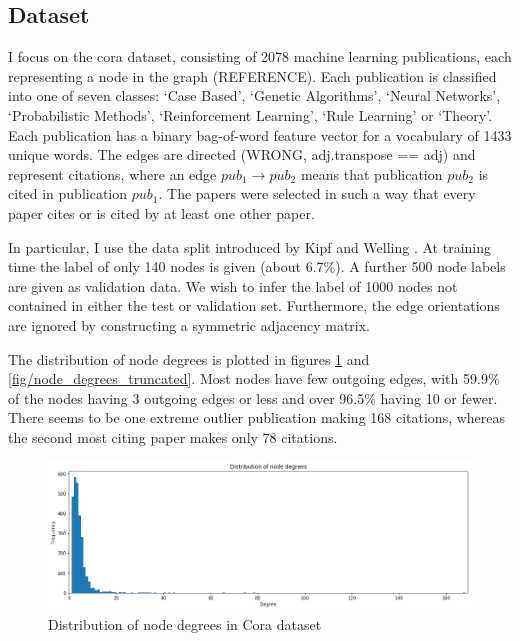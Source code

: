 \documentclass[12pt]{article}
\theoremstyle{definition}
\begin{document}
\subsection{Dataset}
I focus on the cora dataset, consisting of 2078 machine learning publications, each representing a node in the graph (REFERENCE). Each publication is classified into one of seven classes: `Case Based', `Genetic Algorithms', `Neural Networks', `Probabilistic Methods', `Reinforcement Learning', `Rule Learning' or `Theory'. Each publication has a binary bag-of-word feature vector for a vocabulary of 1433 unique words. The edges are directed (WRONG, adj.transpose == adj) and represent citations, where an edge $\mathit{pub_1} \to \mathit{pub_2}$ means that publication $\mathit{pub_2}$ is cited in publication $\mathit{pub_1}$. The papers were selected in such a way that every paper cites or is cited by at least one other paper.

In particular, I use the data split introduced by Kipf and Welling \cite{kipf2017semi}. At training time the label of only 140 nodes is given (about 6.7\%). A further 500 node labels are given as validation data. We wish to infer the label of 1000 nodes not contained in either the test or validation set. Furthermore, the edge orientations are ignored by constructing a symmetric adjacency matrix.

The distribution of node degrees is plotted in figures \ref{fig/node_degrees} and \ref{fig/node_degrees_truncated}. Most nodes have few outgoing edges, with 59.9\% of the nodes having 3 outgoing edges or less and over 96.5\% having 10 or fewer. There seems to be one extreme outlier publication making 168 citations, whereas the second most citing paper makes only 78 citations.

\begin{figure}[h]
	\includegraphics[width=1.0\textwidth]{node_degrees}
	\centering
	\caption{Distribution of node degrees in Cora dataset}
	\label{fig/node_degrees}
\end{figure}
\end{document}
